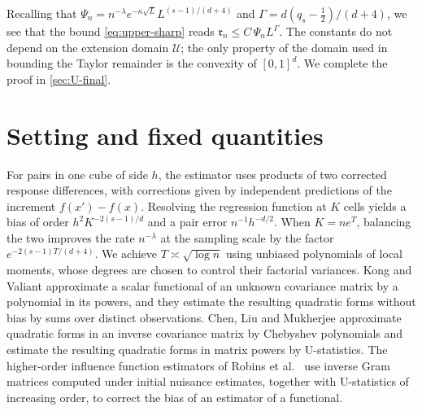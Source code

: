 Recalling that
$\Psi_n=n^{-\lambda}e^{-\kappa\sqrt L}L^{(s-1)/(d+4)}$ and
$\Gamma=d(q_s-\tfrac12)/(d+4)$, we see that the bound
\eqref{eq:upper-sharp} reads $\mathfrak r_n\le C\,\Psi_nL^{\Gamma}$.
The constants do not depend on the extension domain $\mathcal U$; the
only property of the domain used in bounding the Taylor remainder is the
convexity of $[0,1]^d$. We complete the proof in
\cref{sec:U-final}.

\section{Setting and fixed quantities}\label{sec:U-setup}

For pairs in one cube of side $h$, the estimator uses products of
two corrected response differences, with corrections given by
independent predictions of the increment $f(x')-f(x)$.
Resolving the regression function at $K$ cells yields a bias of order
$h^2K^{-2(s-1)/d}$ and a pair error $n^{-1}h^{-d/2}$. When $K=ne^T$,
balancing the two improves the rate $n^{-\lambda}$ at the sampling
scale by the factor $e^{-2(s-1)T/(d+4)}$. We achieve
$T\asymp\sqrt{\log n}$ using unbiased polynomials of local moments,
whose degrees are chosen to control their factorial variances.
Kong and Valiant \cite[Section~2.2]{KongValiant2018} approximate a
scalar functional of an unknown covariance matrix by a polynomial in its
powers, and they estimate the resulting quadratic forms without bias by
sums over distinct observations. Chen, Liu and Mukherjee
\cite[Section~3.2]{ChenLiuMukherjee2024} approximate quadratic forms in
an inverse covariance matrix by Chebyshev polynomials and estimate the
resulting quadratic forms in matrix powers by U-statistics. The higher-order influence function
estimators of Robins et al.\ \cite[Theorems~3.14--3.15]{RobinsEtAl2008}
use inverse Gram matrices computed under initial nuisance estimates,
together with U-statistics of increasing order, to correct the bias of
an estimator of a functional.

